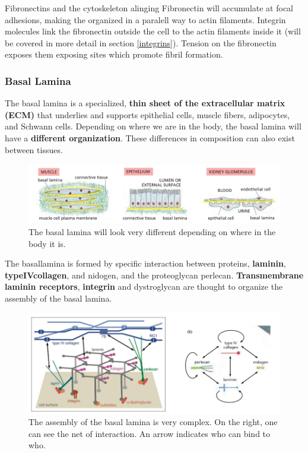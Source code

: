 \documentclass[../main.tex]{subfiles}
\begin{document}
\begin{RemarkWithTitel}{Fibronectins and the cytoskeleton alinging}
	Fibronectin will accumulate at focal adhesions, making the organized in a paralell way to actin filaments. Integrin molecules link the fibronectin outside the cell to the actin filaments inside it (will be covered in more detail in section \ref{integrins}). Tension on the fibronectin exposes them exposing sites which promote fibril formation.
\end{RemarkWithTitel}

\subsubsection{Basal Lamina}
The basal lamina is a specialized, \textbf{thin sheet of the extracellular matrix (ECM)} that underlies and supports epithelial cells, muscle fibers, adipocytes, and Schwann cells. Depending on where we are in the body, the basal lamina will have a\textbf{ different organization}. These differences in composition can also exist between tissues.
\begin{figure}[H]
	\centering
	\includegraphics[width=0.7\linewidth]{bl_diff}
	\caption{The basal lamina will look very different depending on where in the body it is.}
	\label{fig:bldiff}
\end{figure}

The \gls{basallamina} is formed by specific interaction between proteins, \textbf{\gls{laminin}},\textbf{ \gls{typeIVcollagen}}, and \gls{nidogen}, and the \gls{proteoglycan} \gls{perlecan}. \textbf{Transmembrane laminin receptors}, \textbf{\gls{integrin}} and \gls{dystroglycan} are thought to organize the assembly of the basal lamina.

\begin{figure}[H]
	\centering
	\includegraphics[width=0.8\linewidth]{bl_form}
	\caption{The assembly of the basal lamina is very complex. On the right, one can see the net of interaction. An arrow indicates who can bind to who.}
	\label{fig:blform}
\end{figure}
\end{document}
